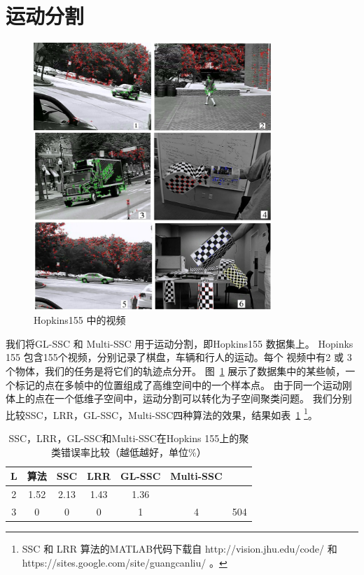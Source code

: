 \documentclass[main.tex]{subfiles}
\begin{document}
\section{运动分割}
\begin{figure}[tb]
  \centering
  \includegraphics[width=0.8\textwidth]{pics/newsnp.jpg}
  \caption{Hopkins155 中的视频 }
  \label{snpsht}
\end{figure}
我们将GL-SSC 和 Multi-SSC 用于运动分割，即Hopkins155 \cite{tron2007benchmark}
数据集上。 Hopinks 155 包含155个视频，分别记录了棋盘，车辆和行人的运动。每个
视频中有2 或 3 个物体，我们的任务是将它们的轨迹点分开。
图~\ref{snpsht}
展示了数据集中的某些帧，一个标记的点在多帧中的位置组成了高维空间中的一个样本点。
由于同一个运动刚体上的点在一个低维子空间中，运动分割可以转化为子空间聚类问题。
我们分别比较SSC，LRR，GL-SSC，Multi-SSC四种算法的效果，结果如表~\ref{tab:hopkins}
\footnote{SSC 和 LRR 算法的MATLAB代码下载自 http://vision.jhu.edu/code/ 和
https://sites.google.com/site/guangcanliu/ 。}。
\begin{table}[h]
  \label{tab:hopkins}
  \centering
  \begin{tabular}{|c | c |c| c | c | c | c | }
	\hline
	L & 算法 & SSC & LRR & GL-SSC & Multi-SSC \\
	\hline  \hline
	2 & 1.52 & 2.13& 1.43 & 1.36 \\
	\hline
	3 & 0 & 0 & 0  &  1 & 4 & 504 \\
	\hline
  \end{tabular}
  \caption{SSC，LRR，GL-SSC和Multi-SSC在Hopkins
  155上的聚类错误率比较（越低越好，单位\%）}
\end{table}
\end{document}
